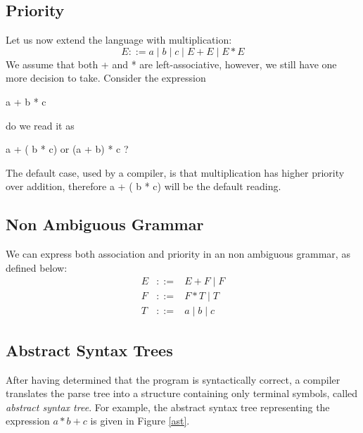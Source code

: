 \documentclass{article}
\begin{document}
\subsection*{Priority}
Let us now extend the language with multiplication:
$$ E ::= a\mid b \mid c \mid E + E \mid E * E$$
We assume that both + and * are left-associative, however, we still have one more
decision to take.  Consider the expression  
\begin{center}
a + b * c 
\end{center}
do we read it as 
\begin{center}
a + ( b * c) or (a + b) * c ? 
\end{center}
 The default case, used by a
compiler, is that multiplication has higher priority over addition, therefore
 a + ( b * c) will be the default reading.
 
\subsection*{Non Ambiguous Grammar}
We can express both association and priority in 
an non ambiguous grammar, as
defined below:
%
$$\begin{array}{lll}
E & ::= & E + F \mid F \\
F & ::= & F * T \mid T\\
T & ::= & a \mid b \mid c 
\end{array}$$


\subsection*{Abstract Syntax Trees}
After having determined that the program is syntactically correct, a compiler translates the parse tree into
a structure containing only terminal symbols, called  {\color{red} {\emph{abstract syntax tree}}}. For example, the 
abstract syntax tree representing the expression $a*b+c$ is given in Figure \ref{ast}.
\end{document}
